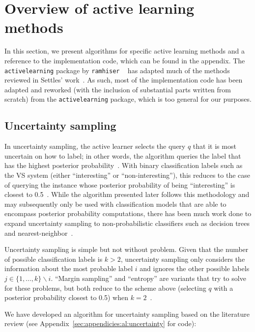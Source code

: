 \section{Overview of active learning methods}
\label{sec:al:methods}

In this section, we present algorithms for specific active learning methods and 
a reference to the implementation code, which can be found in the appendix. The 
\texttt{activelearning} package by \texttt{ramhiser} ~\cite{ramhiser2015} has 
adapted much of the methods reviewed in Settles' work~\cite{settles2010}. As 
such, most of the implementation code has been adapted and reworked (with the 
inclusion of substantial parts written from scratch) from the 
\texttt{activelearning} package, which is too general for our purposes.

\subsection{Uncertainty sampling}
\label{sec:al:methods:uncertainty} 

In uncertainty sampling, the active learner selects the query $q$ that it is 
most uncertain on how to label; in other words, the algorithm queries the label 
that has the highest posterior probability~\cite{lewis1994}. With binary 
classification labels such as the VS system (either ``interesting'' or 
``non-interesting''), this reduces to the case of querying the instance whose 
posterior probability of being ``interesting'' is closest to 
0.5~\cite{lewis1994}. While the algorithm presented later follows this 
methodology and may subsequently only be used with classification models that 
are able to encompass posterior probability computations, there has been much 
work done to expand uncertainty sampling to non-probabilistic classifiers such 
as decision trees and nearest-neighbor~\cite{settles2010}.

Uncertainty sampling is simple but not without problem. Given that the 
number of possible classification labels is $k > 2$, uncertainty sampling only 
considers the information about the most probable label $i$ and ignores the 
other possible labels $j \in \{1,...,k\}\backslash i$. ``Margin sampling'' and 
``entropy'' are variants that try to solve for these problems, but 
both reduce to the scheme above (selecting $q$ with a posterior probability 
closest to 0.5) when $k=2$~\cite{settles2010}.

We have developed an algorithm for uncertainty sampling based on the literature 
review (see Appendix~\ref{sec:appendicies:al:uncertainty} for code):

